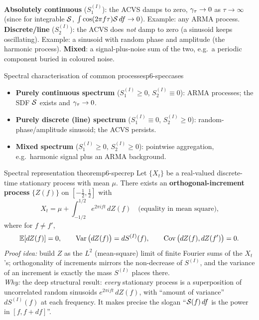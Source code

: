 \begin{intuition}
\textbf{Absolutely continuous} ($S^{(I)}_1$): the ACVS damps to zero,
$\gamma_\tau\to0$ as $\tau\to\infty$ (since for integrable $\mathcal{S}$,
$\int\cos(2\pi f\tau)\mathcal{S}\,df\to0$). Example: any ARMA process.
\textbf{Discrete/line} ($S^{(I)}_2$): the ACVS does \emph{not} damp to zero
(a sinusoid keeps oscillating). Example: a sinusoid with random phase and
amplitude (the harmonic process). \textbf{Mixed}: a signal-plus-noise sum of
the two, e.g.\ a periodic component buried in coloured noise.
\end{intuition}

\begin{example}{Spectral characterisation of common processes}{p6-speccases}
\begin{itemize}
  \item \textbf{Purely continuous spectrum} ($S^{(I)}_1\ge0$,
        $S^{(I)}_2\equiv0$): ARMA processes; the SDF $\mathcal{S}$ exists and
        $\gamma_\tau\to0$.
  \item \textbf{Purely discrete (line) spectrum} ($S^{(I)}_1\equiv0$,
        $S^{(I)}_2\ge0$): random-phase/amplitude sinusoid; the ACVS persists.
  \item \textbf{Mixed spectrum} ($S^{(I)}_1\ge0$, $S^{(I)}_2\ge0$): pointwise
        aggregation, e.g.\ harmonic signal plus an ARMA background.
\end{itemize}
\end{example}

\begin{theorem}{Spectral representation theorem}{p6-specrep}
Let $\{X_t\}$ be a real-valued discrete-time stationary process with mean
$\mu$. There exists an \textbf{orthogonal-increment process} $\{Z(f)\}$ on
$[-\tfrac12,\tfrac12]$ with
\[
X_t=\mu+\int_{-1/2}^{1/2} e^{2\pi i f t}\,dZ(f)
\quad\text{(equality in mean square),}
\]
where for $f\ne f'$,
\[
\mathbb{E}[dZ(f)]=0,\qquad
\operatorname{Var}\big(dZ(f)\big)=dS^{(I)}(f),\qquad
\operatorname{Cov}\big(dZ(f),dZ(f')\big)=0 .
\]
\textit{Proof idea:} build $Z$ as the $L^2$ (mean-square) limit of finite
Fourier sums of the $X_t$'s; orthogonality of increments mirrors the
non-decrease of $S^{(I)}$, and the variance of an increment is exactly the mass
$S^{(I)}$ places there.\\
\textit{Why:} the deep structural result: \emph{every} stationary process is a
superposition of uncorrelated random sinusoids $e^{2\pi i f t}\,dZ(f)$, with
``amount of variance'' $dS^{(I)}(f)$ at each frequency. It makes precise the
slogan ``$\mathcal{S}(f)\,df$ is the power in $[f,f+df]$''.
\end{theorem}


